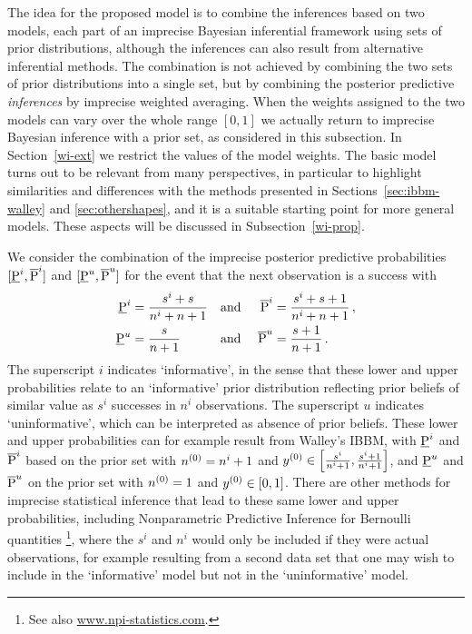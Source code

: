 The idea for the proposed model is to combine the inferences
based on two models, each part of an imprecise
Bayesian inferential framework using sets of prior distributions,
although the inferences can also result from alternative inferential
methods. The combination is not achieved by
combining the two sets of prior distributions into a single set, but
by combining the posterior predictive \emph{inferences}
by imprecise weighted averaging. When the weights assigned to the
two models can vary over the whole range $[0,1]$ we actually return
to imprecise Bayesian inference with a prior set, as considered in this subsection.
In Section~\ref{wi-ext} we
restrict the values of the model weights. The basic model
turns out to be relevant from many perspectives, in
particular to highlight similarities and differences with the
methods presented in Sections~\ref{sec:ibbm-walley} and
\ref{sec:othershapes}, and it is a suitable starting point for more
general models. These aspects will be discussed in
Subsection~\ref{wi-prop}.

We consider the combination of the imprecise posterior
predictive probabilities $[\underline{\operatorname{P}}^i, \overline{\operatorname{P}}^i]$ and $[\underline{\operatorname{P}}^u, \overline{\operatorname{P}}^u]$ for
the event that the next observation is a success with
\begin{align}
\underline{\operatorname{P}}^i &= \frac{s^i+s}{n^i+n+1} & \text{and }& & \overline{\operatorname{P}}^i &= \frac{s^i+s+1}{n^i+n+1}\,,  \label{ilowupp} \\
\underline{\operatorname{P}}^u &= \frac{s}{n+1}         & \text{and }& & \overline{\operatorname{P}}^u &= \frac{s+1}{n+1}        \,.  \label{ulowupp}
\end{align}
The superscript $i$ indicates `informative', in the sense
that these lower and upper probabilities relate to an `informative'
prior distribution reflecting prior
beliefs of similar value as $s^i$ successes in $n^i$ observations.
The superscript $u$ indicates `uninformative', which can be interpreted
as absence of prior beliefs. These
lower and upper probabilities can for example result from
Walley's IBBM, with $\underline{\operatorname{P}}^i$ and $\overline{\operatorname{P}}^i$ based on the prior set with
$n^{(0)} = n^i+1$ and $y^{(0)} \in \left[\frac{s^i}{n^i+1},\frac{s^i+1}{n^i+1}\right]$,
and $\underline{\operatorname{P}}^u$ and $\overline{\operatorname{P}}^u$ on the prior set with $n^{(0)} = 1$ and $y^{(0)} \in [0,1]$.
There are other methods for imprecise statistical inference that
lead to these same lower and upper probabilities, including
Nonparametric Predictive Inference for Bernoulli quantities
\parencite{1998:coolen}\footnote{See also \url{www.npi-statistics.com}.},
where the $s^i$ and $n^i$ would only be included if they were actual
observations, for example resulting from a second data set that one
may wish to include in the `informative' model but not in the `uninformative' model.

